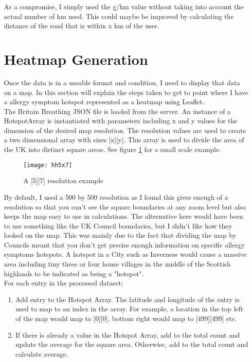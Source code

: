 As a compromise, I simply used the g/km value without taking into account the actual number of km used. This could maybe be improved by calculating the distance of the road that is within x km of the user.

\section{Heatmap Generation}

Once the data is in a useable format and condition, I need to display that data on a map. In this section will explain the steps taken to get to point where I have a allergy symptom hotspot represented as a heatmap using Leaflet.\\

The Britain Breathing JSON file is loaded from the server. An instance of a HotspotArray is instantiated with parameters including x and y values for the dimension of the desired map resolution. The resolution values are used to create a two dimensional array with sizes [x][y]. This array is used to divide the area of the UK into distinct square areas. See figure \ref{fig:hh} for a small scale example.

\begin{figure}[H]
\begin{center}
\texttt{[image: hh5x7]}
\caption{A [5][7] resolution example}
\label{fig:hh}
\end{center}
\end{figure}

By default, I used a 500 by 500 resolution as I found this gives enough of a resolution so that you can't see the square boundaries at any zoom level but also keeps the map easy to use in calculations. The alternative here would have been to use something like the UK Council boundaries, but I didn't like how they looked on the map. This was mainly due to the fact that dividing the map by Councils meant that you don't get precise enough information on specific allergy symptoms hotspots. A hotspot in a City such as Inverness would cause a massive area including tiny three or four house villages in the middle of the Scottish highlands to be indicated as being a "hotspot".\\

For each entry in the processed dataset;

\begin{enumerate}
    \item Add entry to the Hotspot Array. The latitude and longitude of the entry is used to map to an index in the array. For example, a location in the top left of the map would map to [0][0], bottom right would map to [499][499] etc. 
    \item If there is already a value in the Hotspot Array, add to the total count and update the average for the square area. Otherwise, add to the total count and calculate average.
\end{enumerate}

